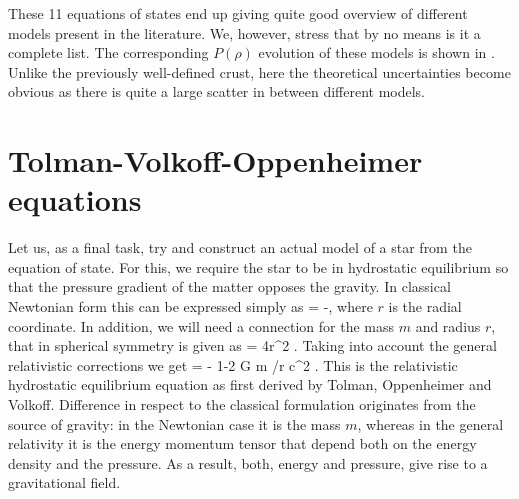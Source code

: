 These 11 equations of states end up giving quite good overview of different models present in the literature.
We, however, stress that by no means is it a complete list.
The corresponding $P(\rho)$ evolution of these models is shown in .
Unlike the previously well-defined crust, here the theoretical uncertainties become obvious as there is quite a large scatter in between different models.


\section{Tolman-Volkoff-Oppenheimer equations}
Let us, as a final task, try and construct an actual model of a star from the equation of state.
For this, we require the star to be in hydrostatic equilibrium so that the pressure gradient of the matter opposes the gravity.
In classical Newtonian form this can be expressed simply as
\be\label{eq:hydrobal}
 = -,
\ee
where $r$ is the radial coordinate.
In addition, we will need a connection for the mass $m$ and radius $r$, that in spherical symmetry is given as
\be\label{eq:hydrobalGR}
 = 4\pi r^2 \rho.
\ee
Taking into account the general relativistic corrections we get
\be
{} = 
    - \times 
    {1-2 G m /r c^2 }.
\ee
This is the relativistic hydrostatic equilibrium equation as first derived by Tolman\cite{Tolman39}, Oppenheimer and Volkoff\cite{OV39}.\cite[for an introduction, see, e.g.,][]{Wald84, Gravitation}
Difference in respect to the classical formulation originates from the source of gravity:
in the Newtonian case it is the mass $m$, whereas in the general relativity it is the energy momentum tensor that depend both on the energy density and the pressure.
As a result, both, energy and pressure, give rise to a gravitational field.


